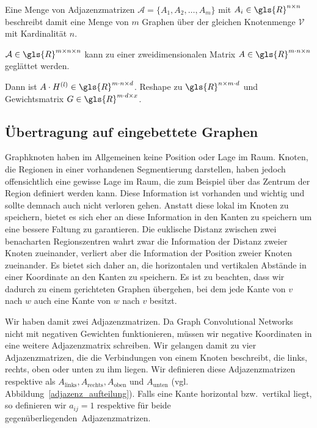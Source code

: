 Eine Menge von Adjazenzmatrizen $\mathcal{A} = \lbrace A_1, A_2, \ldots, A_m \rbrace$ mit $A_i \in \gls{R}^{n \times n}$ beschreibt damit eine Menge von $m$ Graphen über der gleichen Knotenmenge $\mathcal{V}$ mit Kardinalität $n$.

$\mathcal{A} \in \gls{R}^{m \times n \times n}$ kann zu einer zweidimensionalen Matrix $A \in \gls{R}^{m \cdot n \times n}$ geglättet werden.

Dann ist $A \cdot H^{(l)} \in \gls{R}^{m \cdot n \times d}$.
Reshape zu $\gls{R}^{n \times m \cdot d}$ und Gewichtsmatrix $G \in \gls{R}^{m \cdot d \times x}$.

\subsection{Übertragung auf eingebettete Graphen}

Graphknoten haben im Allgemeinen keine Position oder Lage im Raum.
Knoten, die Regionen in einer vorhandenen Segmentierung darstellen, haben jedoch offensichtlich eine gewisse Lage im Raum, die zum Beispiel über das Zentrum der Region definiert werden kann.
Diese Information ist vorhanden und wichtig und sollte demnach auch nicht verloren gehen.
Anstatt diese lokal im Knoten zu speichern, bietet es sich eher an diese Information in den Kanten zu speichern um eine bessere Faltung zu garantieren.
Die euklische Distanz zwischen zwei benacharten Regionszentren wahrt zwar die Information der Distanz zweier Knoten zueinander, verliert aber die Information der Position zweier Knoten zueinander.
Es bietet sich daher an, die horizontalen und vertikalen Abstände in einer Koordinate an den Kanten zu speichern.
Es ist zu beachten, dass wir dadurch zu einem gerichteten Graphen übergehen, bei dem jede Kante von $v$ nach $w$ auch eine Kante von $w$ nach $v$ besitzt.

Wir haben damit zwei Adjazenzmatrizen.
Da Graph Convolutional Networks nicht mit negativen Gewichten funktionieren, müssen wir negative Koordinaten in eine weitere Adjazenzmatrix schreiben.
Wir gelangen damit zu vier Adjazenzmatrizen, die die Verbindungen von einem Knoten beschreibt, die links, rechts, oben oder unten zu ihm liegen.
Wir definieren diese Adjazenzmatrizen respektive als $A_{\text{links}}, A_{\text{rechts}}, A_{\text{oben}}$ und $A_{\text{unten}}$ (vgl. Abbildung~\ref{adjazenz_aufteilung}).
Falls eine Kante horizontal bzw.\ vertikal liegt, so definieren wir $a_{ij} = 1$ respektive für beide \glqq{}gegenüberliegenden\grqq\ Adjazenzmatrizen.

